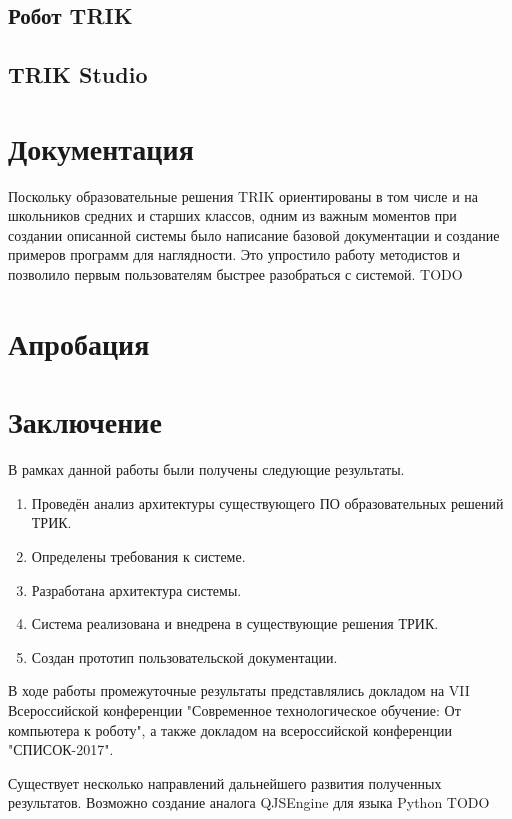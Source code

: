 \documentclass[14pt]{matmex-diploma-custom}
\begin{document}
\subsection{Робот TRIK}

\subsection{TRIK Studio}


\section{Документация}
Поскольку образовательные решения TRIK ориентированы в том числе и на школьников средних и старших классов, одним из важным моментов при создании описанной системы было написание базовой документации и создание примеров программ для наглядности. Это упростило работу методистов и позволило первым пользователям быстрее разобраться с системой. TODO

\section{Апробация}


\section*{Заключение}

В рамках данной работы были получены следующие результаты.
\begin{enumerate}
\item Проведён анализ архитектуры существующего ПО образовательных решений ТРИК.
\item Определены требования к системе.
\item Разработана архитектура системы.
\item Система реализована и внедрена в существующие решения ТРИК.
\item Создан прототип пользовательской документации.
\end{enumerate}


В ходе работы промежуточные результаты представлялись докладом на VII Всероссийской конференции "Современное технологическое обучение: От компьютера к роботу", а также докладом на всероссийской конференции "СПИСОК-2017".

Существует несколько направлений дальнейшего развития полученных результатов. Возможно создание аналога QJSEngine для языка Python TODO

\setmonofont[Mapping=tex-text]{CMU Typewriter Text}


\end{document}
